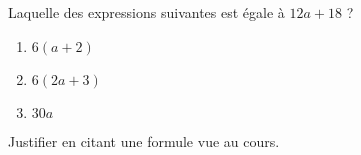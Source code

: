 
\begin{exercice}\label{exo2smath-0020}

    Laquelle des expressions suivantes est égale à \( 12a+18\) ?
    \begin{enumerate}
        \item
            \( 6(a+2)\)
        \item
            \( 6(2a+3)\)
        \item
            \( 30a\)
    \end{enumerate}
    Justifier en citant une formule vue au cours.

\end{exercice}
